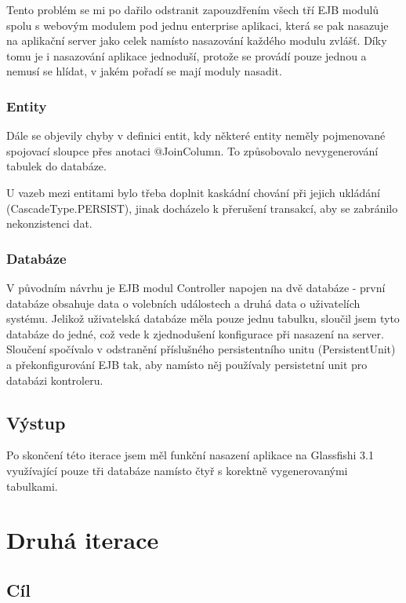 \documentclass[11pt,twoside,a4paper]{book}
\begin{document}
Tento problém se mi po dařilo odstranit zapouzdřením všech tří EJB modulů spolu s webovým modulem pod jednu enterprise aplikaci, která se pak nasazuje na aplikační server jako celek namísto nasazování každého modulu zvlášť. Díky tomu je i nasazování aplikace jednoduší, protože se provádí pouze jednou a nemusí se hlídat, v jakém pořadí se mají moduly nasadit.

\subsubsection{Entity}

Dále se objevily chyby v definici entit, kdy některé entity neměly pojmenované spojovací sloupce přes anotaci @JoinColumn. To způsobovalo nevygenerování tabulek do databáze.

U vazeb mezi entitami bylo třeba doplnit kaskádní chování při jejich ukládání (CascadeType.PERSIST), jinak docházelo k přerušení transakcí, aby se zabránilo nekonzistenci dat.

\subsubsection{Databáze}

V původním návrhu je EJB modul Controller napojen na dvě databáze - první databáze obsahuje data o volebních událostech a druhá data o uživatelích systému. Jelikož uživatelská databáze měla pouze jednu tabulku, sloučil jsem tyto databáze do jedné, což vede k zjednodušení konfigurace při nasazení na server. Sloučení spočívalo v odstranění příslušného persistentního unitu (PersistentUnit) a překonfigurování EJB tak, aby namísto něj používaly persistetní unit pro databázi kontroleru.


\subsection{Výstup}

Po skončení této iterace jsem měl funkční nasazení aplikace na Glassfishi 3.1 využívající pouze tři databáze namísto čtyř s korektně vygenerovanými tabulkami.


\section{Druhá iterace}

\subsection{Cíl}
\end{document}
